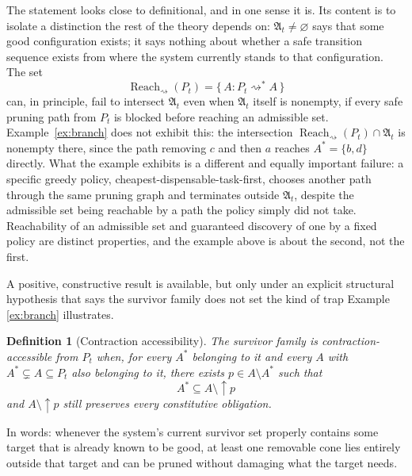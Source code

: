 \documentclass[11pt]{report}
\newtheorem{definition}{Definition}[chapter]
\begin{document}
The statement looks close to definitional, and in one sense it is. Its content is to isolate a distinction the rest of the theory depends on: $\mathfrak A_t \ne \varnothing$ says that some good configuration exists; it says nothing about whether a safe transition sequence exists from where the system currently stands to that configuration. The set
\[
\operatorname{Reach}_\rightsquigarrow(P_t) = \{\, A : P_t \rightsquigarrow^\ast A \,\}
\]
can, in principle, fail to intersect $\mathfrak A_t$ even when $\mathfrak A_t$ itself is nonempty, if every safe pruning path from $P_t$ is blocked before reaching an admissible set. Example~\ref{ex:branch} does not exhibit this: the intersection $\operatorname{Reach}_\rightsquigarrow(P_t) \cap \mathfrak A_t$ is nonempty there, since the path removing $c$ and then $a$ reaches $A^\ast = \{b, d\}$ directly. What the example exhibits is a different and equally important failure: a specific greedy policy, cheapest-dispensable-task-first, chooses another path through the same pruning graph and terminates outside $\mathfrak A_t$, despite the admissible set being reachable by a path the policy simply did not take. Reachability of an admissible set and guaranteed discovery of one by a fixed policy are distinct properties, and the example above is about the second, not the first.

A positive, constructive result is available, but only under an explicit structural hypothesis that says the survivor family does not set the kind of trap Example \ref{ex:branch} illustrates.

\begin{definition}[Contraction accessibility]
The survivor family is contraction-accessible from $P_t$ when, for every $A^\ast$ belonging to it and every $A$ with $A^\ast \subsetneq A \subseteq P_t$ also belonging to it, there exists $p \in A \setminus A^\ast$ such that
\[
A^\ast \subseteq A \setminus \uparrow p
\]
and $A \setminus \uparrow p$ still preserves every constitutive obligation.
\end{definition}

In words: whenever the system's current survivor set properly contains some target that is already known to be good, at least one removable cone lies entirely outside that target and can be pruned without damaging what the target needs.
\end{document}
